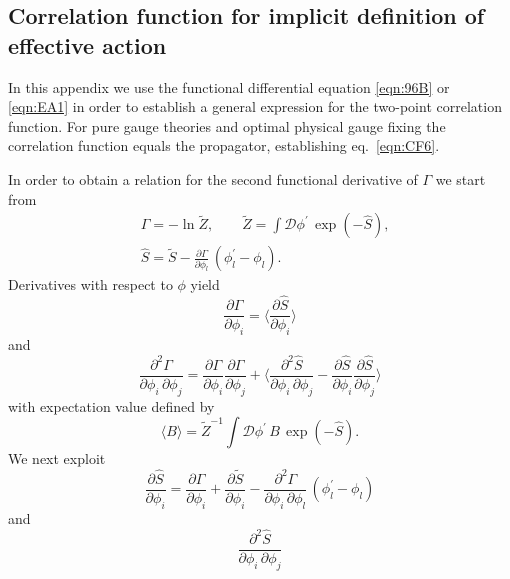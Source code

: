 \documentclass[twocolumn,aps,prd,amsmath,amssymb,preprintnumbers,longbibliography]{revtex4-1}
\numberwithin{equation}{section}
\newenvironment{alignedeqn}{\begin{equation}\begin{aligned}}{\end{aligned}\end{equation}\ignorespacesafterend}
\begin{document}
\begin{appendices}
\section{Correlation function for implicit definition of effective action}
\label{app:correlation function}

In this appendix we use the functional differential equation \eqref{eqn:96B} or \eqref{eqn:EA1} in order to establish a general expression for the two-point correlation function. For pure gauge theories and optimal physical gauge fixing the correlation function equals the propagator, establishing eq.~\eqref{eqn:CF6}.

In order to obtain a relation for the second functional derivative of $\Gamma$ we start from
\begin{alignedeqn}\label{eqn:MN1}
	&\Gamma
	= -\ln \tilde{Z},
	\qquad
	\tilde{Z}
	= \int \mathcal{D} \phi^\prime \, \exp(-\hat{S}),\\
	&\hat{S}
	= \tilde{S} - \frac{\partial \Gamma}{\partial \phi_l} \, (\phi_l^\prime - \phi_l).
\end{alignedeqn}
Derivatives with respect to $\phi$ yield
\begin{equation}\label{eqn:MN2}
	\frac{\partial \Gamma}{\partial \phi_i}
	= \biggl\langle\frac{\partial \hat{S}}{\partial \phi_i}\biggr\rangle
\end{equation}
and
\begin{equation}\label{eqn:MN3}
	\frac{\partial^2 \Gamma}{\partial \phi_i \, \partial \phi_j}
	= \frac{\partial \Gamma}{\partial \phi_i} \frac{\partial \Gamma}{\partial \phi_j} + \biggl\langle\frac{\partial^2 \hat{S}}{\partial \phi_i \, \partial \phi_j} - \frac{\partial \hat{S}}{\partial \phi_i} \frac{\partial \hat{S}}{\partial \phi_j}\biggr\rangle
\end{equation}
with expectation value defined by
\begin{equation}\label{eqn:MN4}
	\langle B\rangle
	= \tilde{Z}^{-1} \int \mathcal{D} \phi^\prime \, B \, \exp(-\hat{S}).
\end{equation}
We next exploit
\begin{equation}\label{eqn:MN5}
	\frac{\partial \hat{S}}{\partial \phi_i}
	= \frac{\partial \Gamma}{\partial \phi_i} + \frac{\partial \tilde{S}}{\partial \phi_i} - \frac{\partial^2 \Gamma}{\partial \phi_i \, \partial \phi_l} \, (\phi_l^\prime - \phi_l)
\end{equation}
and
\begin{equation}\label{eqn:MN6}
	\frac{\partial^2 \hat{S}}{\partial \phi_i \, \partial \phi_j}

\end{equation}
\end{appendices}
\end{document}
